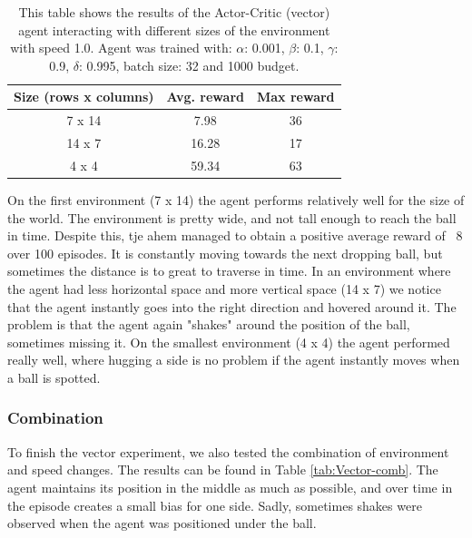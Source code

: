 \documentclass{article}
\begin{document}
\begin{table}[]
    \centering
    \begin{tabular}{|c|c|c|}
        \hline
        \textbf{Size (rows x columns)} & \textbf{Avg. reward} & \textbf{Max reward} \\
        \hline
        7 x 14                & 7.98       & 36                  \\
        14 x 7                & 16.28       & 17                  \\
        4 x 4                 & 59.34       & 63             \\
        \hline
    \end{tabular}
    \caption{This table shows the results of the Actor-Critic (vector) agent interacting with different sizes of the environment with speed 1.0. 
    Agent was trained with: $\alpha$: 0.001, $\beta$: 0.1, $\gamma$: 0.9, $\delta$: 0.995, batch size: 32 and 1000 budget. }
    \label{tab:Vector-size}
\end{table}

On the first environment (7 x 14) the agent performs relatively well for the size of the world.
The environment is pretty wide, and not tall enough to reach the ball in time. 
Despite this, tje ahem managed to obtain a positive average reward of ~8 over 100 episodes. 
It is constantly moving towards the next dropping ball, but sometimes the distance is to great to traverse in time. 
In an environment where the agent had less horizontal space and more vertical space (14 x 7) we notice that the agent instantly goes into the right direction and hovered around it.
The problem is that the agent again "shakes" around the position of the ball, sometimes missing it. 
On the smallest environment (4 x 4) the agent performed really well, where hugging a side is no problem if the agent instantly moves when a ball is spotted.

\subsubsection{Combination}
To finish the vector experiment, we also tested the combination of environment and speed changes.
The results can be found in Table \ref{tab:Vector-comb}. 
The agent maintains its position in the middle as much as possible, and over time in the episode creates a small bias for one side.
Sadly, sometimes shakes were observed when the agent was positioned under the ball.  
\end{document}
